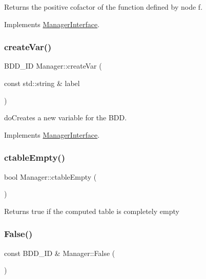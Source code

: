\begin{DoxyReturn}{Returns}
the positive cofactor of the function defined by node f. 
\end{DoxyReturn}


Implements \hyperlink{classManagerInterface_a205c88e6546302e6d41d4239b38ecb12}{Manager\+Interface}.

\mbox{\label{classManager_a9fb480d8af44c75ee2b35b85f7038e68}} 
\subsubsection{\texorpdfstring{create\+Var()}{createVar()}}
{\footnotesize\ttfamily B\+D\+D\+\_\+\+ID Manager\+::create\+Var (\begin{DoxyParamCaption}\item[{const std\+::string \&}]{label }\end{DoxyParamCaption})\hspace{0.3cm}{\ttfamily [virtual]}}

do\+Creates a new variable for the B\+DD. 

Implements \hyperlink{classManagerInterface_a594a44f1304270f150257cfd5f7aa103}{Manager\+Interface}.

\mbox{\label{classManager_a8be64b55798d49545a549266ae1e9281}} 
\subsubsection{\texorpdfstring{ctable\+Empty()}{ctableEmpty()}}
{\footnotesize\ttfamily bool Manager\+::ctable\+Empty (\begin{DoxyParamCaption}{ }\end{DoxyParamCaption})}

\begin{DoxyReturn}{Returns}
true if the computed table is completely empty 
\end{DoxyReturn}
\mbox{\label{classManager_ae9bae01509e6063313024cd85a8eb569}} 
\subsubsection{\texorpdfstring{False()}{False()}}
{\footnotesize\ttfamily const B\+D\+D\+\_\+\+ID \& Manager\+::\+False (\begin{DoxyParamCaption}{ }\end{DoxyParamCaption})\hspace{0.3cm}{\ttfamily [virtual]}}


